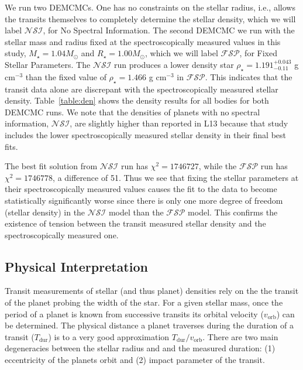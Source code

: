 \documentclass[oneside]{emulateapj}
\begin{document}
We run two DEMCMCs. One has no constraints on the stellar radius, i.e., allows the transits themselves to completely determine the stellar density, which we will label $\mathcal{NSI}$, for No Spectral Information. The second DEMCMC we run with the stellar mass and radius fixed at the spectroscopically measured values in this study, $M_\star=1.04M_\odot$ and $R_\star=1.00M_\odot$, which we will label $\mathcal{FSP}$, for Fixed Stellar Parameters. The $\mathcal{NSI}$ run produces a lower density star $\rho_\star = 1.191^{+0.043}_{-0.11}$ g cm$^{-3}$ than the fixed value of $\rho_\star = 1.466$ g cm$^{-3}$ in $\mathcal{FSP}$. This indicates that the transit data alone are discrepant with the spectroscopically measured stellar density. Table~\ref{table:den} shows the density results for all bodies for both DEMCMC runs. We note that the densities of planets with no spectral information, $\mathcal{NSI}$, are slightly higher than reported in L13 because that study includes the lower spectroscopically measured stellar density in their final best fits.

The best fit solution from $\mathcal{NSI}$ run has $\chi^2 = 1746727$, while the $\mathcal{FSP}$ run has $\chi^2 = 1746778$, a difference of 51. Thus we see that fixing the stellar parameters at their spectroscopically measured values causes the fit to the \Kepler data to become statistically significantly worse since there is only one more degree of freedom (stellar density) in the $\mathcal{NSI}$ model than the $\mathcal{FSP}$ model. This confirms the existence of tension between the transit measured stellar density and the spectroscopically measured one.  

\subsection{Physical Interpretation}

Transit measurements of stellar (and thus planet) densities rely on the the transit of the planet probing the width of the star. For a given stellar mass, once the period of a planet is known from successive transits its orbital velocity ($v_\mathrm{orb}$) can be determined. The physical distance a planet traverses during the duration of a transit ($T_\mathrm{dur}$) is to a very good approximation $T_\mathrm{dur} / v_\mathrm{orb}$. There are two main degeneracies between the stellar radius and and the measured duration: (1) eccentricity of the planets orbit and (2) impact parameter of the transit. 
\end{document}

